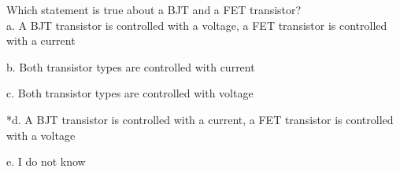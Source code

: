
Which statement is true about a BJT and a FET transistor? \\

a. A BJT transistor is controlled with a voltage, a FET transistor is controlled with a current

b. Both transistor types are controlled with current

c. Both transistor types are controlled with voltage

*d. A BJT transistor is controlled with a current, a FET transistor is controlled with a voltage

e. I do not know \\ 
